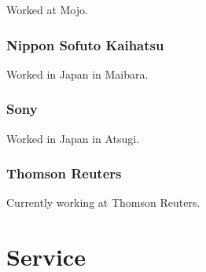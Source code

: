 \documentclass{article}
\begin{document}
Worked at Mojo.

\subsubsection{Nippon Sofuto Kaihatsu}

Worked in Japan in Maibara.

\subsubsection{Sony}

Worked in Japan in Atsugi.

\subsubsection{Thomson Reuters}

Currently working at Thomson Reuters.

\section{Service}
\end{document}
